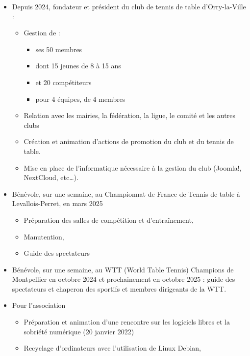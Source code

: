 \begin{itemize}
    \item{Depuis 2024, fondateur et président du club de tennis de table d’Orry-la-Ville  :}
        \begin{itemize}
            \item{Gestion de :}
                \begin{itemize}
                    \item{ses 50 membres}
                    \item{dont 15 jeunes de 8 à 15 ans}
                    \item{et 20 compétiteurs}
                    \item{pour 4 équipes, de 4 membres}
                \end{itemize}
            \item{Relation avec les mairies, la fédération, la ligue, le comité et les autres clubs}
            \item{Création et animation d’actions de promotion du club et du tennis de table.}
            \item{Mise en place de l’informatique nécessaire à la gestion du club (Joomla!, NextCloud, etc\dots).}
        \end{itemize}
    \item{Bénévole, sur une semaine, au Championnat de France de Tennis de table à Levallois-Perret, en mars 2025}
        \begin{itemize}
            \item{Préparation des salles de compétition et d'entraînement,}
            \item{Manutention,}
            \item{Guide des spectateurs}
        \end{itemize}
    \item{Bénévole, sur une semaine, au WTT (World Table Tennis) Champions de Montpellier en octobre 2024 et prochainement en octobre 2025 : guide des spectateurs et chaperon des sportifs et membres dirigeants de la WTT.}
    \item{Pour l'association }
        \begin{itemize}
            \item{Préparation et animation d'une rencontre sur les logiciels libres et la sobriété numérique (20 janvier 2022)}
            \item{Recyclage d'ordinateurs avec l'utilisation de Linux Debian,}

\end{itemize}
\end{itemize}
